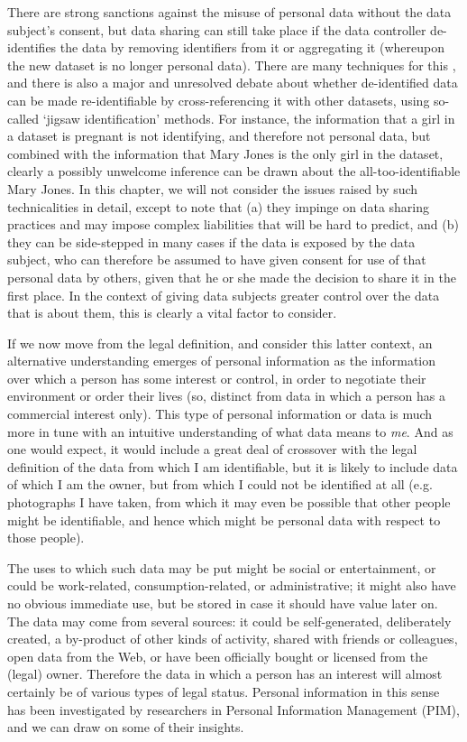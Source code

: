 \documentclass[runningheads,a4paper]{llncs}
\begin{document}
There are strong sanctions against the misuse of personal data without the data subject’s consent, but data sharing can still take place if the data controller de-identifies the data by removing identifiers from it or aggregating it (whereupon the new dataset is no longer personal data). There are many techniques for this \cite{}, and there is also a major and unresolved debate \cite{} about whether de-identified data can be made re-identifiable by cross-referencing it with other datasets, using so-called `jigsaw identification’ methods. For instance, the information that a girl in a dataset is pregnant is not identifying, and therefore not personal data, but combined with the information that Mary Jones is the only girl in the dataset, clearly a possibly unwelcome inference can be drawn about the all-too-identifiable Mary Jones. In this chapter, we will not consider the issues raised by such technicalities in detail, except to note that (a) they impinge on data sharing practices and may impose complex liabilities that will be hard to predict, and (b) they can be side-stepped in many cases if the data is exposed by the data subject, who can therefore be assumed to have given consent for use of that personal data by others, given that he or she made the decision to share it in the first place. In the context of giving data subjects greater control over the data that is about them, this is clearly a vital factor to consider.

If we now move from the legal definition, and consider this latter context, an alternative understanding emerges of personal information as the information over which a person has some interest or control, in order to negotiate their environment or order their lives (so, distinct from data in which a person has a commercial interest only). This type of personal information or data is much more in tune with an intuitive understanding of what data means to {\em me}. And as one would expect, it would include a great deal of crossover with the legal definition of the data from which I am identifiable, but it is likely to include data of which I am the owner, but from which I could not be identified at all (e.g. photographs I have taken, from which it may even be possible that other people might be identifiable, and hence which might be personal data with respect to those people).

The uses to which such data may be put might be social or entertainment, or could be work-related, consumption-related, or administrative; it might also have no obvious immediate use, but be stored in case it should have value later on. The data may come from several sources: it could be self-generated, deliberately created, a by-product of other kinds of activity, shared with friends or colleagues, open data from the Web, or have been officially bought or licensed from the (legal) owner. Therefore the data in which a person has an interest will almost certainly be of various types of legal status. Personal information in this sense has been investigated by researchers in Personal Information Management (PIM), and we can draw on some of their insights.
\end{document}
